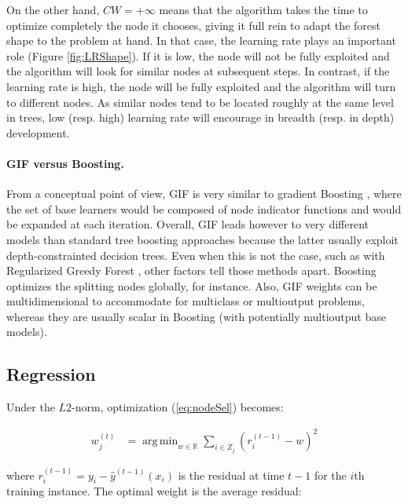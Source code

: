 \documentclass{article}
\DeclareMathOperator*{\argmin}{arg\,min}
\begin{document}
On the other hand, $CW=+\infty$ means that the algorithm takes the
time to optimize completely the node it chooses, giving it full rein
to adapt the forest shape to the problem at hand. In that case, the
learning rate plays an important role (Figure \ref{fig:LRShape}). If
it is low, the node will not be fully exploited and the algorithm will
look for similar nodes at subsequent steps.  In contrast, if the
learning rate is high, the node will be fully exploited and the
algorithm will turn to different nodes.  As similar nodes tend to be
located roughly at the same level in trees, low (resp. high) learning
rate will encourage in breadth (resp. in depth) development.


\paragraph{GIF versus Boosting.}
From a conceptual point of view, GIF is very similar to gradient Boosting
\cite{friedman2001gradboost}, where the set of base learners would be composed 
of node indicator functions and would be expanded at each iteration. Overall, 
GIF leads however to very different models than standard tree boosting 
approaches because the latter usually exploit depth-constrainted decision 
trees. Even when this is not the case, such as with Regularized Greedy Forest 
\cite{johnson2014regforest}, other factors tell those methods apart. Boosting 
optimizes the splitting nodes globally, for instance. Also, GIF weights can be 
multidimensional to accommodate for multiclass or multioutput problems, whereas 
they are usually scalar in Boosting (with potentially multioutput base models).


\subsection{Regression}
\label{subsec:regression}

Under the $L2$-norm, optimization (\ref{eq:nodeSel}) becomes:

\vspace*{-\baselineskip}
\begin{align}\label{eq:L2min}
w_j^{(t)} &=  \argmin_{w \in \mathbb{R}} \sum_{i \in Z_j} \left(r_i^{(t-1)} - 
w\right)^2
\end{align}
\vspace*{-\baselineskip}

where $r_i^{(t-1)} = y_i - \hat{y}^{(t-1)}(x_i)$ is the residual at time $t-1$ 
for the $i$th training instance.
The optimal weight is the average residual:
\end{document}
